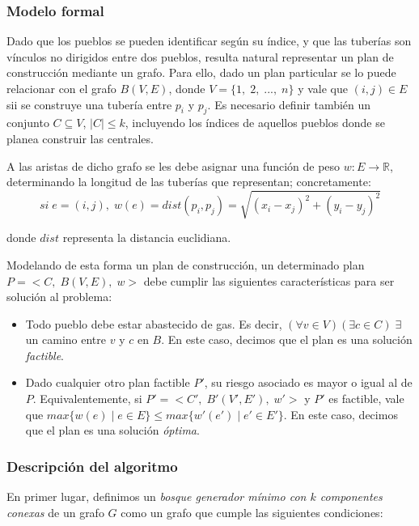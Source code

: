 \subsubsection{Modelo formal}

Dado que los pueblos se pueden identificar según su índice, y que las tuberías son vínculos no dirigidos entre dos pueblos, resulta natural representar un plan de construcción mediante un grafo. Para ello, dado un plan particular se lo puede relacionar con el grafo $B(V, E)$, donde $V = \{1,\;2,\;...,\;n\}$ y vale que $(i,j) \in E$ sii se construye una tubería entre $p_i$ y $p_j$. Es necesario definir también un conjunto $C \subseteq V$, $|C| \leq k$, incluyendo los índices de aquellos pueblos donde se planea construir las centrales.

A las aristas de dicho grafo se les debe asignar una función de peso $w:E\rightarrow\mathbb{R}$, determinando la longitud de las tuberías que representan; concretamente:
$$si\;e = (i,j),\;w(e) = dist(p_i,p_j) = \sqrt{(x_i - x_j)^2 + (y_i - y_j)^2}$$

donde $dist$ representa la distancia euclidiana.

Modelando de esta forma un plan de construcción, un determinado plan $P = <C,\;B(V, E),\;w>$ debe cumplir las siguientes características para ser solución al problema:

\begin{itemize}
  \item Todo pueblo debe estar abastecido de gas. Es decir, $(\forall v \in V)(\exists c \in C)\;\exists$ un camino entre $v$ y $c$ en $B$. En este caso, decimos que el plan es una solución \emph{factible}.
  
  \item Dado cualquier otro plan factible $P'$, su riesgo asociado es mayor o igual al de $P$. Equivalentemente, si $P' = <C',\;B'(V', E'),\;w'>$ y $P'$ es factible, vale que $max\{w(e)\;|\;e\in E\} \leq max\{w'(e')\;|\;e'\in E'\}$. En este caso, decimos que el plan es una solución \emph{óptima}.
\end{itemize}

\subsubsection{Descripción del algoritmo}

En primer lugar, definimos un \emph{bosque generador mínimo con $k$ componentes conexas} de un grafo $G$ como un grafo que cumple las siguientes condiciones:

